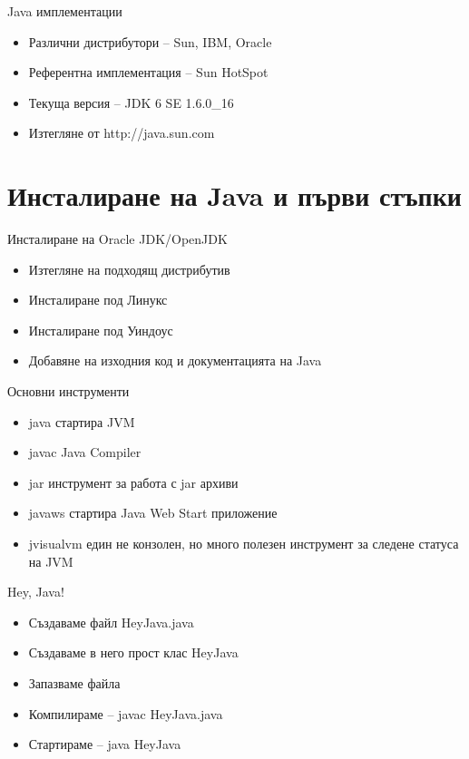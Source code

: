 \documentclass{beamer}
\begin{document}
\begin{frame}{Java имплементации}
  \transdissolve
  \begin{itemize}
  \item Различни дистрибутори – Sun, IBM,
  Oracle

  \item Референтна имплементация – Sun
  HotSpot

  \item Текуща версия – JDK 6 SE 1.6.0\_16
  \item Изтегляне от http://java.sun.com
  \end{itemize}
\end{frame}

\section{Инсталиране на Java и първи стъпки}


\begin{frame}{Инсталиране на Oracle JDK/OpenJDK}
  \transdissolve  
  \begin{itemize}
    \item Изтегляне на подходящ дистрибутив
    \item Инсталиране под Линукс
    \item Инсталиране под Уиндоус
    \item Добавяне на изходния код и
      документацията на Java
  \end{itemize}

\end{frame}


\begin{frame}{Основни инструменти}
  \transdissolve  
  \begin{itemize}
    \item java стартира JVM
    \item javac Java Compiler
    \item jar инструмент за работа с jar архиви
    \item javaws стартира Java Web Start
    приложение
    \item jvisualvm един не конзолен, но много
    полезен инструмент за следене статуса
    на JVM
  \end{itemize}

\end{frame}


\begin{frame}{Hey, Java!}
  \transdissolve  
  \begin{itemize}
    \item Създаваме файл HeyJava.java
    \item Създаваме в него прост клас HeyJava
    \item Запазваме файла
    \item Компилираме – javac HeyJava.java
    \item Стартираме – java HeyJava
  \end{itemize}

\end{frame}
\end{document}

